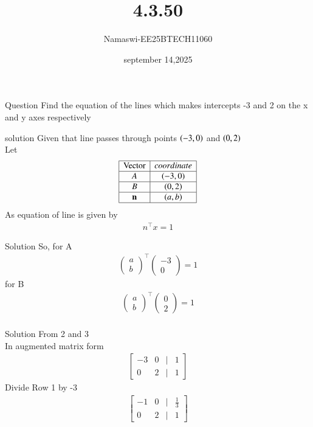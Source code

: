 \documentclass{beamer}
\begin{document}
\title 
{4.3.50}
\date{september 14,2025}


\author 
{Namaswi-EE25BTECH11060}
\frame{\titlepage}
\begin{frame}{Question}
Find the equation of the lines which makes intercepts -3 and 2 on the x and y axes respectively
\end{frame}
\begin{frame}{solution}
Given that line passes through points $\left(-3,0\right)$ and $\left(0,2\right)$ \\
Let
\[
\begin{array}{|c|c|}
\hline
\text{Vector} & coordinate \\ \hline
A & (-3, 0) \\ \hline
B & (0, 2) \\ \hline
\mathbf{n} & (a, b) \\ \hline
\end{array}
\]
As equation of line is given by 
\begin{align}
    n^\top x=1
\end{align}
\end{frame}
\begin{frame}{Solution}
   So, for A 
 \begin{align}
 \begin{pmatrix}
     a \\ b 
 \end{pmatrix}^\top\begin{pmatrix}
     -3  \\ 0
 \end{pmatrix}=1
  \end{align}
  for B
 \begin{align}
 \begin{pmatrix}
     a \\ b 
 \end{pmatrix}^\top\begin{pmatrix}
     0  \\  2
 \end{pmatrix}=1\\ 
\end{align}
\end{frame}
\begin{frame}{Solution}
    From 2 and 3\\
In augmented matrix form\\
\begin{align}
\begin{bmatrix}
-3 & 0 & \big| & 1 \\
0 & 2 & \big| & 1
\end{bmatrix}
\end{align}
Divide Row 1 by -3
\begin{align}
\begin{bmatrix}
-1 & 0 & \big| & \frac{1}{3}\\
0 &  2  & \big| & 1
\end{bmatrix}
\end{align}
\end{frame}
\end{document}
